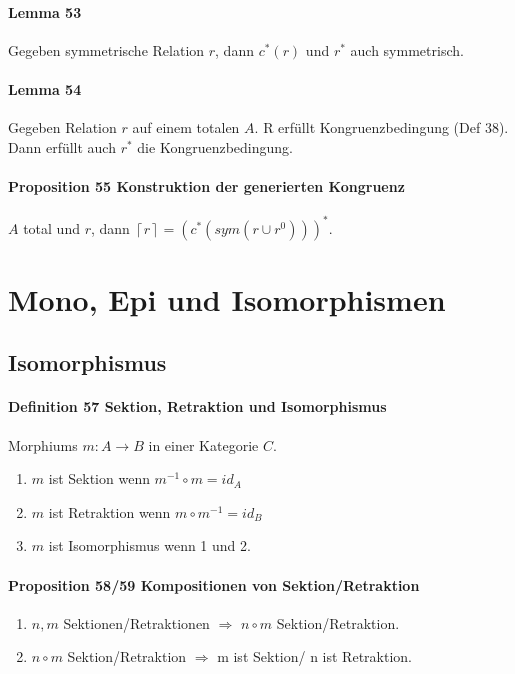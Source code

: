 \paragraph{Lemma 53}
Gegeben symmetrische Relation $r$, dann $c^*(r)$ und $r^*$ auch symmetrisch.


\paragraph{Lemma 54}
Gegeben Relation $r$ auf einem totalen $A$. R erfüllt Kongruenzbedingung (Def 38). Dann erfüllt auch $r^*$ die Kongruenzbedingung.


\paragraph{Proposition 55 Konstruktion der generierten Kongruenz}
$A$ total und $r$, dann $\left\lceil r\right\rceil =\left(c^{*}\left(sym\left(r\cup r^{0}\right)\right)\right)^{*}$.

\section{Mono, Epi und Isomorphismen}

\subsection{Isomorphismus}

\paragraph{Definition 57 Sektion, Retraktion und Isomorphismus}
Morphiums $m: A \rightarrow B$ in einer Kategorie $C$.
\begin{enumerate}
\item$m$ ist Sektion wenn $m^{-1} \circ m = id_A$
\item$m$ ist Retraktion  wenn $m \circ m^{-1}  = id_B$
\item $m$ ist Isomorphismus wenn 1 und 2.
\end{enumerate}

\paragraph{Proposition 58/59 Kompositionen von Sektion/Retraktion}
\begin{enumerate}
\item $n, m$ Sektionen/Retraktionen $\Rightarrow$ $n \circ m$ Sektion/Retraktion.
\item $n \circ m$ Sektion/Retraktion $\Rightarrow$ m ist Sektion/ n ist Retraktion.
\end{enumerate}


